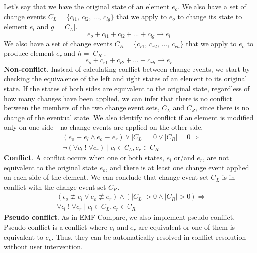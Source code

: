Let’s say that we have the original state of an element $e_{o}$. We also have a set of change events $C_{L}$ = $\{$$c_{l1}$, $c_{l2}$, ..., $c_{lg}$$\}$ that we apply to $e_{o}$ to change its state to element $e_{l}$ and $g = |C_{L}|$.
\begin{equation} \label{eq:ecbp_left}
e_{o} + c_{l1} + c_{l2} + ... + c_{lg} \rightarrow e_{l}
\end{equation}
We also have a set of change events $C_{R}$ = $\{$$c_{r1}$, $c_{r2}$, ..., $c_{rh}$$\}$ that we apply to $e_{o}$ to produce element $e_{r}$ and $h = |C_{R}|$.
\begin{equation} \label{eq:ecbp_right}
e_{o} + c_{r1} + c_{r2} + ... + c_{rh} \rightarrow e_{r}
\end{equation}
\textbf{Non-conflict}. Instead of calculating conflict between change events, we start by checking the equivalence of the left and right states of an element to its original state. If the states of both sides are equivalent to the original state, regardless of how many changes have been applied, we can infer that there is no conflict between the members of the two change event sets, $C_{L}$ and $C_{R}$, since there is no change of the eventual state. We also identify no conflict if an element is modified only on one side—no change events are applied on the other side.
\begin{equation} \label{eq:ecbp_nonconflict}
\begin{split}
& (e_{o} \equiv e_{l} \wedge e_{o} \equiv e_{r}) \vee |C_{L}| = 0 \vee |C_{R}| = 0 \Rightarrow\\
& \neg(\forall c_{l} \;!\; \forall c_{r}) \;|\; c_{l} \in C_{L}, c_{r} \in C_{R}
\end{split}
\end{equation}
\textbf{Conflict}. A conflict occurs when one or both states, $e_{l}$ or/and $e_{r}$, are not equivalent to the original state $e_{o}$, and there is at least one change event applied on each side of the element. We can conclude that change event set $C_{L}$ is in conflict with the change event set $C_{R}$.
\begin{equation} \label{eq:ecbp_conflict}
\begin{split}
& (e_{o} \not\equiv e_{l} \vee e_{o} \not\equiv e_{r}) \wedge (|C_{L}| > 0 \wedge |C_{R}| > 0) \Rightarrow\\
& \forall c_{l} \;!\; \forall c_{r} \;|\; c_{l} \in C_{L}, c_{r} \in C_{R}
\end{split}
\end{equation}
\textbf{Pseudo conflict}. As in EMF Compare, we also implement pseudo conflict. Pseudo conflict is a conflict where $e_{l}$ and $e_{r}$ are equivalent or one of them is equivalent to $e_{o}$. Thus, they can be automatically resolved in conflict resolution without user intervention.
